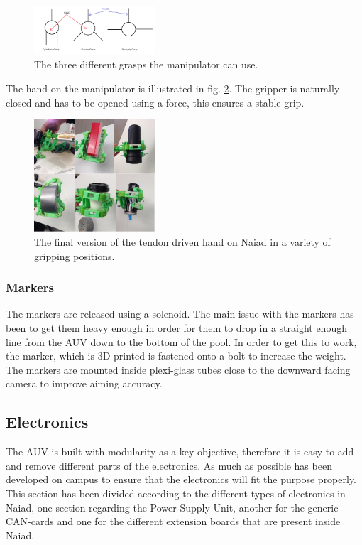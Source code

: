 \documentclass[twoside,12pt]{article}
\begin{document}
\begin{multicols*}{2}
\begin{figure}[H]
\begin{center}
\includegraphics[width=0.4\textwidth]{./images/grasps.png}
\caption{The three different grasps the manipulator can use.}
\label{grasps}
\end{center}
\end{figure}

The hand on the manipulator is illustrated in fig. \ref{hand}. The gripper is naturally closed and has to be opened using a force, this ensures a stable grip. 
\begin{figure}[H]
\begin{center}
\includegraphics[width=0.4\textwidth]{./images/hand.png}
\caption{The final version of the tendon driven hand on Naiad in a variety of gripping positions.}
\label{hand}
\end{center}
\end{figure}
\subsubsection{Markers}
The markers are released using a solenoid. The main issue with the markers has been to get them heavy enough in order for them to drop in a straight enough line from the AUV down to the bottom of the pool. In order to get this 
to work, the marker, which is 3D-printed is fastened onto a bolt to increase the weight. The markers are mounted inside plexi-glass tubes close to the downward facing camera to improve aiming accuracy.
\subsection{Electronics}
The AUV is built with modularity as a key objective, therefore it is easy to add and remove different parts of the electronics. As much as possible has been developed on campus to ensure that the electronics will fit the purpose properly. This section has been divided according to the different types of electronics in Naiad, one section regarding the Power Supply Unit, another for the generic CAN-cards and one for the different extension boards that are present inside Naiad. 

\end{multicols*}
\end{document}
